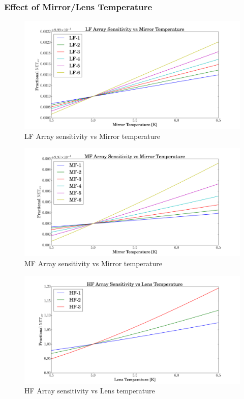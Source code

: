 \documentclass[12pt, titlepage]{article} %
\begin{document}

\subsubsection{Effect of Mirror/Lens Temperature}

\begin{figure}[H]
	\centering
	\includegraphics[width=1.1\textwidth, center]{PDF/TempDependence_Mirror_LF.pdf}
	\caption{LF Array sensitivity vs Mirror temperature}
\end{figure}

\begin{figure}[H]
	\centering
	\includegraphics[width=1.1\textwidth, center]{PDF/TempDependence_Mirror_MF.pdf}
	\caption{MF Array sensitivity vs Mirror temperature}
\end{figure}
	
\begin{figure}[H]
	\centering
	\includegraphics[width=1.1\textwidth, center]{PDF/TempDependence_Lens_HF.pdf}
	\caption{HF Array sensitivity vs Lens temperature}
\end{figure}
\end{document}
